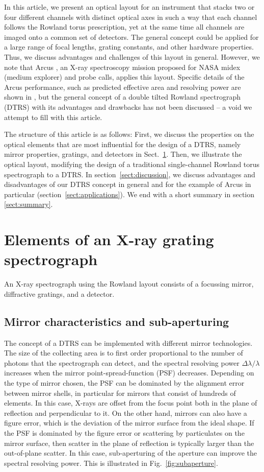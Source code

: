 \documentclass[linenumbers]{aastex631}
\begin{document}
In this article, we present an optical layout for an instrument that stacks two or four different channels with distinct optical axes in such a way that each channel follows the Rowland torus prescription, yet at the same time all channels are imaged onto a common set of detectors. The general concept could be applied for a large range of focal lengths, grating constants, and other hardware properties. Thus, we discuss advantages and challenges of this layout in general. However, we note that Arcus \citep{2023SPIE12678E..0ES}, an X-ray spectroscopy mission proposed for NASA midex (medium explorer) and probe calls, applies this layout. Specific details of the  Arcus performance, such as predicted effective area and resolving power are shown in \citet{2018SPIE10699E..6FG,2023SPIE12678E..1DG}, but the general concept of a double tilted Rowland spectrograph (DTRS) with its advantages and drawbacks has not been discussed -- a void we attempt to fill with this article.

The structure of this article is as follows: First, we discuss the properties on the optical elements that are most influential for the design of a DTRS, namely mirror properties, gratings, and detectors in Sect.~\ref{sect:elements}. Then, we illustrate the optical layout, modifying the design of a traditional single-channel Rowland torus spectrograph to a DTRS. In section~\ref{sect:discussion}, we discuss advantages and disadvantages of our DTRS concept in general and for the example of Arcus in particular (section~\ref{sect:applications}). We end with a short summary in section \ref{sect:summary}.

\section{Elements of an X-ray grating spectrograph}
\label{sect:elements}
An X-ray spectrograph using the Rowland layout consists of a focussing mirror, diffractive gratings, and a detector.

\subsection{Mirror characteristics and sub-aperturing}
The concept of a DTRS can be implemented with different mirror technologies. The size of the collecting area is to first order proportional to the number of photons that the spectrograph can detect, and the spectral resolving power $\Delta \lambda / \lambda$ increases when the mirror point-spread-function (PSF) decreases. Depending on the type of mirror chosen, the PSF can be dominated by the alignment error between mirror shells, in particular for mirrors that consist of hundreds of elements. In this case, X-rays are offset from the focus point both in the plane of reflection and perpendicular to it.
On the other hand, mirrors can also have a figure error, which is the deviation of the mirror surface from the ideal shape. If the PSF is dominated by the figure error or scattering by particulates on the mirror surface, then scatter in the plane of reflection is typically larger than the out-of-plane scatter. In this case, sub-aperturing of the aperture can improve the spectral resolving power. This is illustrated in Fig.~\ref{fig:subaperture}.
\end{document}
